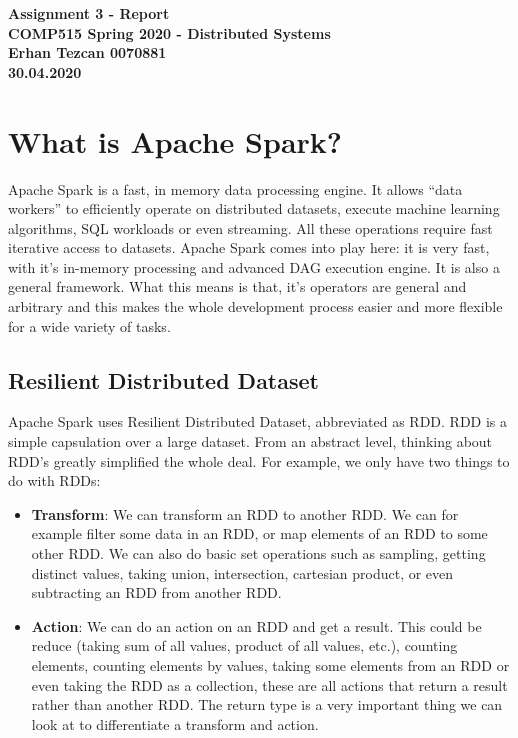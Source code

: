 \documentclass[12pt,reqno]{amsart}
\begin{document}
\begin{center}
\large\textbf{Assignment 3 - Report \\ COMP515 Spring 2020 - Distributed Systems} \\
\normalsize\textbf{Erhan Tezcan 0070881 \\ 30.04.2020} \\
\end{center}

\section{What is Apache Spark?}

Apache Spark is a fast, in memory data processing engine. It allows ``data workers'' to efficiently operate on distributed datasets, execute machine learning algorithms, SQL workloads or even streaming. All these operations require fast iterative access to datasets. Apache Spark comes into play here: it is very fast, with it's in-memory processing and advanced DAG execution engine. It is also a general framework. What this means is that, it's operators are general and arbitrary and this makes the whole development process easier and more flexible for a wide variety of tasks. 

\subsection{Resilient Distributed Dataset}

Apache Spark uses Resilient Distributed Dataset, abbreviated as RDD. RDD is a simple capsulation over a large dataset. From an abstract level, thinking about RDD's greatly simplified the whole deal. For example, we only have two things to do with RDDs:
\begin{itemize}
	\item \textbf{Transform}: We can transform an RDD to another RDD.
	We can for example filter some data in an RDD, or map elements of an RDD to some other RDD. We can also do basic set operations such as sampling, getting distinct values, taking union, intersection, cartesian product, or even subtracting an RDD from another RDD.
	\item \textbf{Action}: We can do an action on an RDD and get a result. This could be reduce (taking sum of all values, product of all values, etc.), counting elements, counting elements by values, taking some elements from an RDD or even taking the RDD as a collection, these are all actions that return a result rather than another RDD. The return type is a very important thing we can look at to differentiate a transform and action.
\end{itemize}
\end{document}

